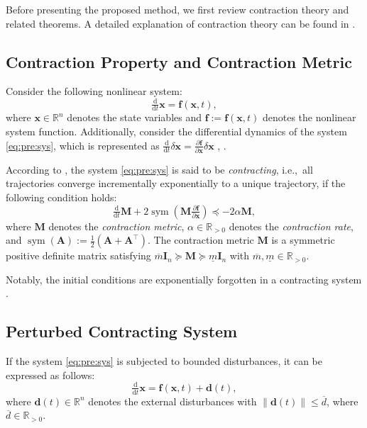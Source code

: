 \documentclass{ifacconf}
\newcommand\ie{\textrm{i.e.,\ }}
\newcommand\R{\mathbb{R}}
\newcommand*{\mv}[1]{\boldsymbol{#1}} %
\newcommand*{\mm}[1]{\boldsymbol{#1}} %
\newcommand*{\norm}[1]{\lVert #1 \rVert} %
\DeclareMathOperator{\mysym}{{sym}}       %
\newcommand\der{\mathrm d}
\newcommand*{\ddtt}{
   \tfrac{\der}{\der t}
}
\newcommand*{\pptfrac}[2]{
   \tfrac{\partial {#1}}{\partial {#2}}
}
\begin{document}
Before presenting the proposed method, we first review contraction theory and related theorems.
A detailed explanation of contraction theory can be found in \cite{LOHMILLER:1998aa,Tsukamoto:2021aa}.

\subsection{Contraction Property and Contraction Metric} \label{sec:sub:contraction}

Consider the following nonlinear system:
\begin{equation} \label{eq:pre:sys}
   \ddtt\mv{x}
   =
   \mv{f}(\mv{x},t)
   ,
\end{equation}
where $\mv{x}\in\R^n$ denotes the state variables and $\mv{f}:=\mv{f}(\mv{x},t)$ denotes the nonlinear system function.
Additionally, consider the differential dynamics of the system \eqref{eq:pre:sys}, which is represented as 
$
   \ddtt{\delta\mv{x}}
   =
   \pptfrac{\mv{f}}{\mv{x}} \delta\mv{x}
$
, \cite[Chap 4]{Kirk:2004aa}.

According to \cite{LOHMILLER:1998aa}, the system \eqref{eq:pre:sys} is said to be \textit{contracting}, \ie all trajectories converge incrementally exponentially to a unique trajectory, if the following condition holds:
\begin{equation} \label{eq:pre:contraction:condition}
   \ddtt\mm{M} 
   + 
   2\mysym
   \left(
      \mm{M} \pptfrac{\mv{f}}{\mv{x}}
   \right) 
   \preceq 
   -2\alpha\mm{M}
   ,
\end{equation}
where $\mm{M}$ denotes the \textit{contraction metric}, $\alpha\in\R_{>0}$ denotes the \textit{contraction rate}, and $\mysym(\mm A):=\tfrac{1}{2}(\mm A+\mm A^\top)$.
The contraction metric $\mm{M}$ is a symmetric positive definite matrix satisfying $\overline{m}\mm{I}_n\succeq\mm{M}\succeq\underline{m}\mm{I}_n$ with $\overline{m},\underline{m}\in\R_{>0}$.

Notably, the initial conditions are exponentially forgotten in a contracting system \cite{LOHMILLER:1998aa}.

\subsection{Perturbed Contracting System} \label{sec:sub:contraction:perturbed}

If the system \eqref{eq:pre:sys} is subjected to bounded disturbances, it can be expressed as follows:
\begin{equation} \label{eq:pre:sys:perturbed}
   \ddtt\mv{x}
   =
   \mv{f}(\mv{x},t)
   +
   \mv{d}(t)
   , 
\end{equation}
where $\mv{d}(t)\in\R^n$ denotes the external disturbances with $\norm{\mv{d}(t)}\leq \overline{d}$, where $\overline{d}\in\R_{>0}$.
\end{document}
